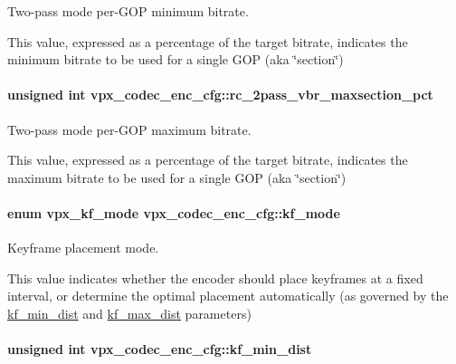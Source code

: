 \-Two-\/pass mode per-\/\-G\-O\-P minimum bitrate. 

\-This value, expressed as a percentage of the target bitrate, indicates the minimum bitrate to be used for a single \-G\-O\-P (aka \char`\"{}section\char`\"{}) \hypertarget{structvpx__codec__enc__cfg_ab5212050b71b2d9f4dc663caa496949e}{
\paragraph[{rc\-\_\-2pass\-\_\-vbr\-\_\-maxsection\-\_\-pct}]{\setlength{\rightskip}{0pt plus 5cm}unsigned int {\bf vpx\-\_\-codec\-\_\-enc\-\_\-cfg\-::rc\-\_\-2pass\-\_\-vbr\-\_\-maxsection\-\_\-pct}}}
\label{structvpx__codec__enc__cfg_ab5212050b71b2d9f4dc663caa496949e}


\-Two-\/pass mode per-\/\-G\-O\-P maximum bitrate. 

\-This value, expressed as a percentage of the target bitrate, indicates the maximum bitrate to be used for a single \-G\-O\-P (aka \char`\"{}section\char`\"{}) \hypertarget{structvpx__codec__enc__cfg_a491d67f061dcdb13f60c017563e9d788}{
\paragraph[{kf\-\_\-mode}]{\setlength{\rightskip}{0pt plus 5cm}enum {\bf vpx\-\_\-kf\-\_\-mode} {\bf vpx\-\_\-codec\-\_\-enc\-\_\-cfg\-::kf\-\_\-mode}}}
\label{structvpx__codec__enc__cfg_a491d67f061dcdb13f60c017563e9d788}


\-Keyframe placement mode. 

\-This value indicates whether the encoder should place keyframes at a fixed interval, or determine the optimal placement automatically (as governed by the \hyperlink{structvpx__codec__enc__cfg_a0a7b5444ecb09745cbe8d5af17553846}{kf\-\_\-min\-\_\-dist} and \hyperlink{structvpx__codec__enc__cfg_ae018440136e271743376730413d25a9b}{kf\-\_\-max\-\_\-dist} parameters) \hypertarget{structvpx__codec__enc__cfg_a0a7b5444ecb09745cbe8d5af17553846}{
\paragraph[{kf\-\_\-min\-\_\-dist}]{\setlength{\rightskip}{0pt plus 5cm}unsigned int {\bf vpx\-\_\-codec\-\_\-enc\-\_\-cfg\-::kf\-\_\-min\-\_\-dist}}}
\label{structvpx__codec__enc__cfg_a0a7b5444ecb09745cbe8d5af17553846}


